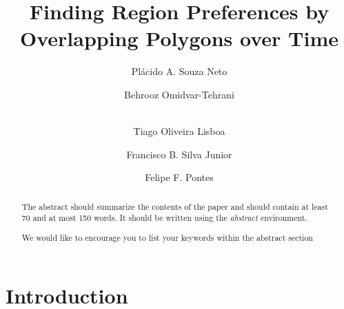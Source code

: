 \documentclass[runningheads,a4paper]{llncs}
\newcommand{\keywords}[1]{\par\addvspace\baselineskip
\noindent\keywordname\enspace\ignorespaces#1}
\begin{document}
\mainmatter  %

\title{Finding Region Preferences by Overlapping Polygons over Time}


%
%
\author{Pl\'acido A. Souza Neto \and Behrooz Omidvar-Tehrani \and \\
Tiago Oliveira Lisboa \and Francisco B. Silva Junior \and Felipe F. Pontes }
%


%
%

\maketitle


\begin{abstract}
The abstract should summarize the contents of the paper and should
contain at least 70 and at most 150 words. It should be written using the
\emph{abstract} environment.
\keywords{We would like to encourage you to list your keywords within
the abstract section}
\end{abstract}


\section{Introduction}
\end{document}
